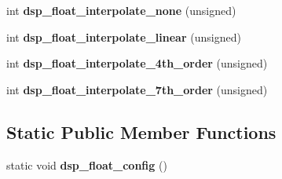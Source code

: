 \begin{DoxyCompactItemize}
\item 
\mbox{\label{class_fluid_s_1_1_voice_a92845f5a0f2835a4ef6211be0a1f9f79}} 
int {\bfseries dsp\+\_\+float\+\_\+interpolate\+\_\+none} (unsigned)
\item 
\mbox{\label{class_fluid_s_1_1_voice_ac6777b36aaffbf3f4141010979788a47}} 
int {\bfseries dsp\+\_\+float\+\_\+interpolate\+\_\+linear} (unsigned)
\item 
\mbox{\label{class_fluid_s_1_1_voice_a42a17e404e716cb1fefac3dd50f6a280}} 
int {\bfseries dsp\+\_\+float\+\_\+interpolate\+\_\+4th\+\_\+order} (unsigned)
\item 
\mbox{\label{class_fluid_s_1_1_voice_a1993f84b48811a87997397c7096f67bb}} 
int {\bfseries dsp\+\_\+float\+\_\+interpolate\+\_\+7th\+\_\+order} (unsigned)
\end{DoxyCompactItemize}
\subsection*{Static Public Member Functions}
\begin{DoxyCompactItemize}
\item 
\mbox{\label{class_fluid_s_1_1_voice_a238be7ff4900b92941039be496a1e58f}} 
static void {\bfseries dsp\+\_\+float\+\_\+config} ()
\end{DoxyCompactItemize}
